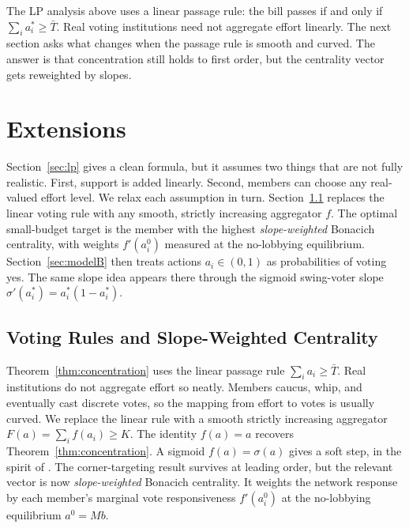 \documentclass[11pt,letterpaper]{article}
\theoremstyle{plain}
\theoremstyle{definition}
\theoremstyle{remark}
\begin{document}
\medskip

The LP analysis above uses a linear passage rule: the bill passes if and only if $\sum_i a_i^* \geq \bar T$. Real voting institutions need not aggregate effort linearly. The next section asks what changes when the passage rule is smooth and curved. The answer is that concentration still holds to first order, but the centrality vector gets reweighted by slopes.


\section{Extensions}
\label{sec:extensions}

Section~\ref{sec:lp} gives a clean formula, but it assumes two things that are not fully realistic. First, support is added linearly. Second, members can choose any real-valued effort level. We relax each assumption in turn. Section~\ref{sec:theorem3} replaces the linear voting rule with any smooth, strictly increasing aggregator $f$. The optimal small-budget target is the member with the highest \emph{slope-weighted} Bonacich centrality, with weights $f'(a^0_i)$ measured at the no-lobbying equilibrium. Section~\ref{sec:modelB} then treats actions $a_i \in (0,1)$ as probabilities of voting yes. The same slope idea appears there through the sigmoid swing-voter slope $\sigma'(a_i^*) = a_i^*(1 - a_i^*)$.

\subsection{Voting Rules and Slope-Weighted Centrality}
\label{sec:theorem3}

Theorem~\ref{thm:concentration} uses the linear passage rule $\sum_i a_i \geq \bar T$. Real institutions do not aggregate effort so neatly. Members caucus, whip, and eventually cast discrete votes, so the mapping from effort to votes is usually curved. We replace the linear rule with a smooth strictly increasing aggregator $F(a) = \sum_i f(a_i) \geq K$. The identity $f(a) = a$ recovers Theorem~\ref{thm:concentration}. A sigmoid $f(a) = \sigma(a)$ gives a soft step, in the spirit of \citet{mckelvey1995}. The corner-targeting result survives at leading order, but the relevant vector is now \emph{slope-weighted} Bonacich centrality. It weights the network response by each member's marginal vote responsiveness $f'(a^0_i)$ at the no-lobbying equilibrium $a^0 = Mb$.
\end{document}
